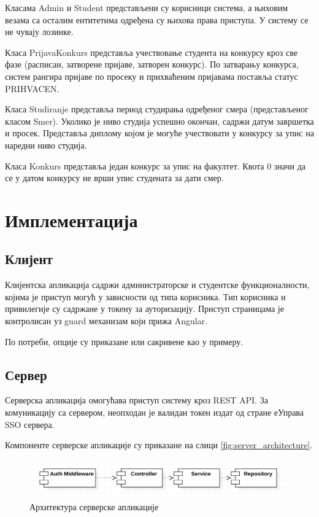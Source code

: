 \documentclass[a4paper]{article}
\begin{document}
Класама Admin и Student представљени су корисници система, а њиховим везама са осталим ентитетима одређена су њихова права приступа. У систему се не чувају лозинке.

Класа PrijavaKonkurs представља учествовање студента на конкурсу кроз све фазе (расписан, затворене пријаве, затворен конкурс).
По затварању конкурса, систем рангира пријаве по просеку и прихваћеним пријавама поставља статус PRIHVACEN.

Класа Studiranje представља период студирања одређеног смера (представљеног класом Smer). Уколико је ниво студија
успешно окончан, садржи датум завршетка и просек. Представља диплому којом је могуће учествовати у конкурсу за упис
на наредни ниво студија.

Класа Konkurs представља један конкурс за упис на факултет. Квота 0 значи да се у датом конкурсу не врши упис студената за дати смер.

\section*{Имплементација}

\subsection*{Клијент}

Клијентска апликација садржи администраторске и студентске функционалности, којима је приступ могућ у зависности од
типа корисника. Тип корисника и привилегије су садржане у токену за ауторизацију. Приступ страницама је контролисан уз guard механизам који прижа Angular.

По потреби, опције су приказане или сакривене као у примеру.

\subsection*{Сервер}

Серверска апликација омогућава приступ систему кроз REST API\cite{rest}. За комуникацију са сервером, неопходан је валидан токен издат од стране еУправа SSO сервера.

Компоненте серверске апликације су приказане на слици \autoref{fig:server_architecture}.

\begin{figure}[H]
    \centering
    \includegraphics{images/server_architecture.png}
    \caption{Архитектура серверске апликације}
    \label{fig:server_architecture}
\end{figure}
\end{document}
